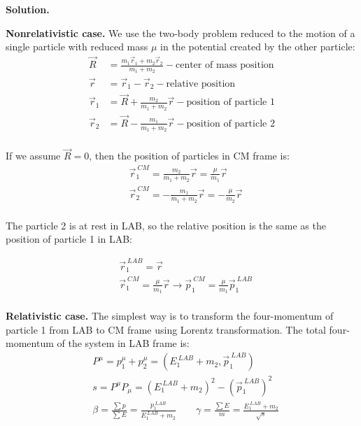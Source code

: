 \documentclass[11pt,a4paper]{article}
\newenvironment{solution}{\vspace{1cm} \par\textbf{Solution.} \vspace{1cm}}{\newpage}
\begin{document}
\begin{solution}

{\bf Nonrelativistic case.} We use the two-body problem reduced to the motion of a single 
particle with reduced mass $\mu$ in the potential created by the other particle:
\begin{align*}
  \vec{R} &= \frac{m_{1} \vec{r}_{1} + m_{2} \vec{r}_{2}}{m_{1} + m_{2}} - \text{center of mass position} \\
  \vec{r} &= \vec{r}_{1} - \vec{r}_{2} - \text{relative position} \\
  \vec{r}_{1} &= \vec{R} + \frac{m_{2}}{m_{1} + m_{2}} \vec{r} - \text{position of particle 1} \\
  \vec{r}_{2} &= \vec{R} - \frac{m_{1}}{m_{1} + m_{2}} \vec{r} - \text{position of particle 2} \\
\end{align*}

If we assume $\vec{R} = 0$, then the position of particles in CM frame is:
\begin{align*}
  & \vec{r}_{1}^{~CM} = \frac{m_{2}}{m_{1} + m_{2}} \vec{r} = \frac{\mu}{m_{1}} \vec{r} \\
  & \vec{r}_{2}^{~CM} = - \frac{m_{1}}{m_{1} + m_{2}} \vec{r} = - \frac{\mu}{m_{2}} \vec{r} \\
\end{align*}


The particle 2 is at rest in LAB, so the relative position is the same as 
the position of particle 1 in LAB:

\begin{align*}
  & \vec{r}_{1}^{~LAB} = \vec{r} \\
  & \vec{r}_{1}^{~CM} = \frac{\mu}{m_{1}} \vec{r} \to \vec{p}_{1}^{~CM} = \frac{\mu}{m_{1}} \vec{p}_{1}^{~LAB} \\
\end{align*}


{\bf Relativistic case.} The simplest way is to transform the four-momentum of particle 1 
from LAB to CM frame using Lorentz transformation. The total four-momentum of the system 
in LAB frame is:
\begin{align*}
  & P^{\mu} = p_{1}^{\mu} + p_{2}^{\mu} = (E_{1}^{~LAB} + m_{2}, \vec{p}_{1}^{~LAB}) \\
  & s = P^{\mu} P_{\mu} = (E_{1}^{~LAB} + m_{2})^{2} - (\vec{p}_{1}^{~LAB})^{2} \\
  & \beta = \frac{\sum p}{\sum E} = \frac{p_{1}^{~LAB}}{E_{1}^{~LAB} + m_{2}} \qquad \gamma = \frac{\sum E}{m} =  \frac{E_{1}^{~LAB} + m_{2}}{\sqrt{s}}
\end{align*}


\end{solution}
\end{document}
